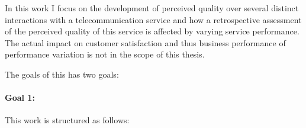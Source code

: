 In this work I focus on the development of perceived quality over several distinct interactions with a telecommunication service and how a retrospective assessment of the perceived quality of this service is affected by varying service performance.
The actual impact on customer satisfaction and thus business performance of performance variation is not in the scope of this thesis.

The goals of this has two goals:
\paragraph{Goal 1:}


This work is structured as follows: